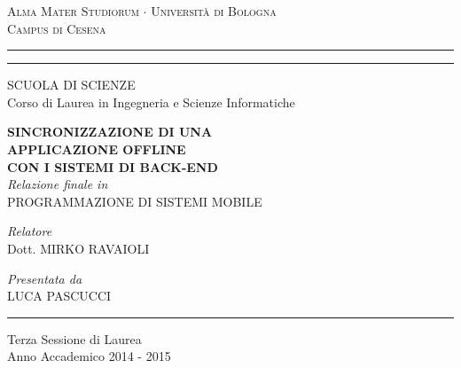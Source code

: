 \documentclass[12pt,a4paper]{report}
\begin{document}
\begin{titlepage}
\begin{center}
{{\Large{\textsc{Alma Mater Studiorum $\cdot$ Universit\`a di Bologna\\Campus di Cesena}}}} 
\rule[0.1cm]{15.8cm}{0.1mm}
\rule[0.5cm]{15.8cm}{0.6mm}
{\small SCUOLA DI SCIENZE\\
Corso di Laurea in Ingegneria e Scienze Informatiche}
\end{center}
\vspace{30mm}
\begin{center}
{\LARGE{\bf SINCRONIZZAZIONE DI UNA}}\\
\vspace{3mm}
{\LARGE{\bf APPLICAZIONE OFFLINE}}\\
\vspace{3mm}
{\LARGE{\bf CON I SISTEMI DI BACK-END}}\\
\vspace{30mm}
{\it Relazione finale in}\\
PROGRAMMAZIONE DI SISTEMI MOBILE
\end{center}
\vspace{30mm}
\par
\noindent
\begin{minipage}[t]{0.47\textwidth}
{\large {\it Relatore}\\
Dott. MIRKO RAVAIOLI}
\end{minipage}
\hfill
\begin{minipage}[t]{0.47\textwidth}\raggedleft
{\large {\it Presentata da}\\
LUCA PASCUCCI}
\end{minipage}
\vspace{20mm}
\begin{center}
\rule[0.1cm]{15.8cm}{0.1mm}
{\large Terza Sessione di Laurea\\
Anno Accademico 2014 - 2015}
\end{center}
\end{titlepage}
\end{document}
